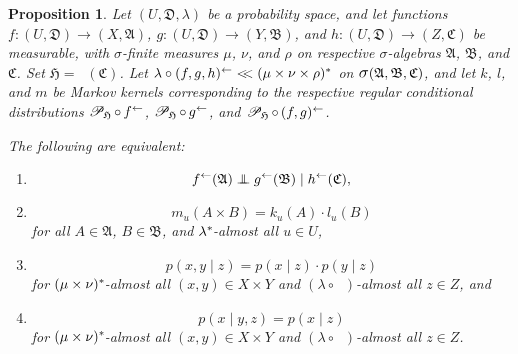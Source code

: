 \documentclass[
twoside=true,
paper=letter,
fontsize=9pt,
pagesize=auto,
leqno,
openany,
headsepline,
overfullrule,
]{scrbook}
\theoremstyle{plain}
\theoremstyle{plain}
\newtheorem{prop}[thm]{Proposition}
\theoremstyle{definition}
\theoremstyle{bfnoteitalic}
\theoremstyle{bfnoteroman}
\newcommand{\sigalg}[1]{\mathfrak{#1}}
\newcommand{\cali}[1]{\mathscr{#1}}
\newcommand{\condprobop}[1]{\mathop{\cali{P}\hspace{-1pt}}\nolimits_{#1}}
\newcommand{\sagb}{\mathop{\hbox{\large{$\sigma$}}}\nolimits}
\newcommand{\textsigma}{\hbox{\large{$\sigma$}}\kern-1pt}
\newcommand{\preimage}[1]{\mathop{#1^{\leftarrow}}}
\newcommand{\sigmaalgebra}{\sigalg{A}}
\newcommand{\sigmaalgebraii}{\sigalg{B}}
\newcommand{\sigmaalgebraiii}{\sigalg{C}}
\newcommand{\productsig}[2]{\sagb(#1,#2)}
\newcommand{\kernast}{\ast\kern-1pt}
\newcommand{\funcf}{f}
\newcommand{\funcg}{g}
\newcommand{\funch}{h}
\newcommand{\funck}{k}
\newcommand{\funcl}{l}
\newcommand{\funcm}{m}
\newcommand{\function}{f}
\newcommand{\functionii}{g}
\newcommand{\functioniii}{h}
\newcommand{\measurespace}{X}
\newcommand{\measurespaceii}{Y}
\newcommand{\measurespaceiii}{Z}
\newcommand{\mspaceeltiii}{z}
\newcommand{\abscont}{\mathrel{< \kern-3.5pt <}}
\newcommand{\measure}{\mu}
\newcommand{\measmu}{\mu}
\newcommand{\measureii}{\nu}
\newcommand{\measnu}{\nu}
\newcommand{\measureiii}{\lambda}
\newcommand{\measlambda}{\lambda}
\newcommand{\measureiv}{\rho}
\newcommand{\seti}{A}
\newcommand{\setii}{B}
\newcommand{\uspace}{U}%
\newcommand{\uspaceelt}{u}
\newcommand{\uspacesig}{\sigalg{D}}
\newcommand{\condindep}[3]{#1\perp\kern-6pt\perp #2\mid #3}
\begin{document}




\begin{prop}\label{conditional_independence_equivalence}
Let
$(\uspace,\uspacesig,\measlambda)$
be a probability space, and let functions
$\function:(\uspace,\uspacesig)\to (\measurespace,\sigmaalgebra)$,
$\functionii:(\uspace,\uspacesig)\to (\measurespaceii,\sigmaalgebraii)$,
and
$\functioniii:(\uspace,\uspacesig)\to (\measurespaceiii,\sigmaalgebraiii)$
be measurable, with \textsigma-finite measures
$\measure$, $\measureii$, and $\measureiv$ on respective \textsigma-algebras
$\sigmaalgebra$, $\sigmaalgebraii$, and $\sigmaalgebraiii$.
Set $\sigalg{H}=\preimage{\funch}(\sigmaalgebraiii)$.
Let
$\measureiii\circ\preimage{(\function,\functionii,\functioniii)}
\abscont
(\measure\times\measureii\times\measureiv)^*$ on
$\productsig{\sigmaalgebra}{\sigmaalgebraii,\sigmaalgebraiii}$,
and let
$\funck$,
$\funcl$,
and
$\funcm$
be Markov kernels corresponding to the respective regular conditional distributions
$\condprobop{\sigalg{H}}\circ \preimage{\funcf}$,
$\condprobop{\sigalg{H}}\circ \preimage{\funcg}$,
and
$\condprobop{\sigalg{H}} \circ \preimage{(\funcf,\funcg)}$.

The following are equivalent:
%
\begin{enumerate}
\item[1)]
\[
\condindep{\preimage{\funcf}(\sigmaalgebra)}{\preimage{\funcg}(\sigmaalgebraii)}
{\preimage{\funch}(\sigmaalgebraiii)},
\]
%
\item[2)]
\[
\funcm_\uspaceelt
(\seti\times\setii)
=
\funck_\uspaceelt(\seti)
\cdot
\funcl_\uspaceelt(\setii)
\]
for all $\seti\in\sigmaalgebra$, $\setii\in\sigmaalgebraii$, and $\measlambda^\kernast$\hyp{}almost all
$\uspaceelt\in\uspace$,
%
\item[3)]
\[
p(x,y\mid z)
=
p(x\mid z) \cdot p(y\mid z)
\]
for
$(\measmu\times\measnu)^\kernast$\hyp{}almost all
$(x,y)\in\measurespace\times\measurespaceii$ and
$(\measlambda\circ\preimage{\funch})$\hyp{}almost all $\mspaceeltiii\in\measurespaceiii$, and
%
\item[4)]
\[
p(x\mid y,z)
=
p(x\mid z)
\]
for
$(\measmu\times\measnu)^\kernast$\hyp{}almost all
$(x,y)\in\measurespace\times\measurespaceii$ and
$(\measlambda\circ\preimage{\funch})$\hyp{}almost all $\mspaceeltiii\in\measurespaceiii$.
\end{enumerate}
\end{prop}
\end{document}
